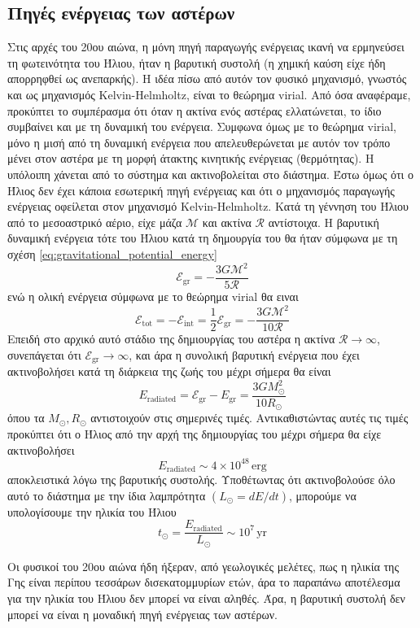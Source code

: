 \subsection{Πηγές ενέργειας των αστέρων}
Στις αρχές του 20ου αιώνα, η μόνη πηγή παραγωγής ενέργειας ικανή να ερμηνεύσει τη φωτεινότητα του Ήλιου, ήταν η βαρυτική συστολή (η χημική καύση είχε ήδη απορρηφθεί ως ανεπαρκής). Η ιδέα πίσω από αυτόν τον φυσικό μηχανισμό, γνωστός και ως μηχανισμός Kelvin-Helmholtz, είναι το θεώρημα virial. Από όσα αναφέραμε, προκύπτει το συμπέρασμα ότι όταν η ακτίνα ενός αστέρας ελλατώνεται, το ίδιο συμβαίνει και με τη δυναμική του ενέργεια. Συμφωνα όμως με το θεώρημα virial, μόνο η μισή από τη δυναμική ενέργεια που απελευθερώνεται με αυτόν τον τρόπο μένει στον αστέρα με τη μορφή άτακτης κινητικής ενέργειας (θερμότητας). Η υπόλοιπη χάνεται από το σύστημα και ακτινοβολείται στο διάστημα. 
Έστω όμως ότι ο Ήλιος δεν έχει κάποια εσωτερική πηγή ενέργειας και ότι ο μηχανισμός παραγωγής ενέργειας οφείλεται στον μηχανισμό Kelvin-Helmholtz. Κατά τη γέννηση του Ήλιου από το μεσοαστρικό αέριο, είχε μάζα $\mathcal{M}$ και ακτίνα $\mathcal{R}$ αντίστοιχα. Η βαρυτική δυναμική ενέργεια τότε του Ήλιου κατά τη δημουργία του θα ήταν σύμφωνα με τη σχέση \eqref{eq:gravitational_potential_energy}
$$\mathcal{E}_{\text{gr}} = - \frac{3G \mathcal{M}^2}{5 \mathcal{R}}$$
ενώ η ολική ενέργεια σύμφωνα με το θεώρημα virial θα ειναι
$$\mathcal{E}_{\text{tot}} = - \mathcal{E}_{\text{int}} = \frac{1}{2}\mathcal{E}_{\text{gr}} = - \frac{3G \mathcal{M}^2}{10 \mathcal{R}}$$
Επειδή στο αρχικό αυτό στάδιο της δημιουργίας του αστέρα η ακτίνα $\mathcal{R} \rightarrow \infty$, συνεπάγεται ότι $\mathcal{E}_{\text{gr}} \rightarrow \infty$, και άρα η συνολική βαρυτική ενέργεια που έχει ακτινοβολήσει κατά τη διάρκεια της ζωής του μέχρι σήμερα θα είναι
\begin{equation}
    E_{\text{radiated}} = \mathcal{E}_{\text{gr}} - E_{\text{gr}} = \frac{3G M_{\odot}^2}{10 R_{\odot}}
\end{equation}
όπου τα $M_{\odot}, R_{\odot}$ αντιστοιχούν στις σημερινές τιμές. Αντικαθιστώντας αυτές τις τιμές προκύπτει ότι ο Ήλιος από την αρχή της δημιουργίας του μέχρι σήμερα θα είχε ακτινοβολήσει
$$E_{\text{radiated}} \sim 4 \times 10^{48} \,\text{erg}$$
αποκλειστικά λόγω της βαρυτικής συστολής. Υποθέτωντας ότι ακτινοβολούσε όλο αυτό το διάστημα με την ίδια λαμπρότητα $(L_{\odot} = dE/dt)$, μπορούμε να υπολογίσουμε την ηλικία του Ήλιου 
$$t_{\odot} = \frac{E_{\text{radiated}}}{L_{\odot}} \sim 10^7 \,\text{yr}$$

Οι φυσικοί του 20ου αιώνα ήδη ήξεραν, από γεωλογικές μελέτες, πως η ηλικία της Γης είναι περίπου τεσσάρων δισεκατομμυρίων ετών, άρα το παραπάνω αποτέλεσμα για την ηλικία του Ήλιου δεν μπορεί να είναι αληθές. Άρα, η βαρυτική συστολή δεν μπορεί να είναι η μοναδική πηγή ενέργειας των αστέρων. 


